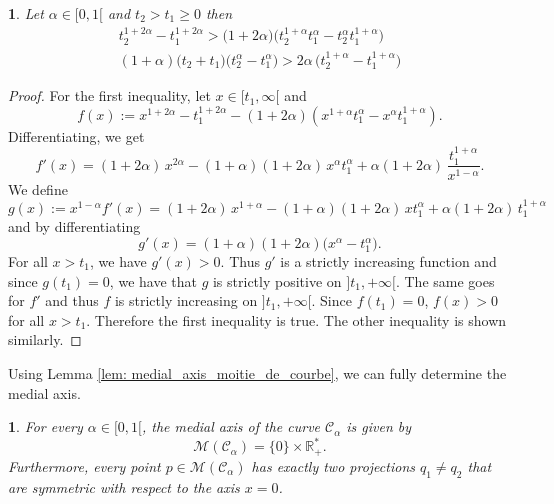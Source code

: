\documentclass[11pt,reqno,a4paper]{article}%
\newtheorem{lemma}[theorem]{\sc{Lemma}}
\theoremstyle{definition}
\theoremstyle{remark}
\renewcommand{\geq}{\geqslant}
\newcommand{\R}{\mathbb{R}}
\newcommand{\C}{\mathbb{C}}
\renewcommand{\C}{\mathcal{C}}
\begin{document}
\begin{lemma} \label{lem: cas_pair_inegalite_intermediare}
Let $\alpha \in [0,1[$ and $t_2 > t_1 \geq 0$ then 
\begin{align*}
	 t_2^{1+2 \alpha} - t_1^{1+2\alpha} > \big( 1+2 \alpha \big) \Big( t_2^{1+\alpha} t_1^\alpha - t_2^\alpha t_1^{1+\alpha} \Big) \\
     (1+\alpha) \big( t_2 + t_1 \big) \big( t_2^{\alpha} - t_1^{\alpha} \big) > 2 \alpha \, \big( t_2^{1+\alpha} - t_1^{1+\alpha} \big)
\end{align*}
\end{lemma}

\begin{proof}
For the first inequality, let $x \in [t_1, \infty [$ and
\[ f(x) := x^{1+2\alpha} - t_1^{1+2\alpha} - ( 1+2 \alpha ) ( x^{1+\alpha} t_1^\alpha - x^\alpha t_1^{1+\alpha} ).\]
Differentiating, we get
\[f'(x) = (1+2 \alpha) \, x^{2\alpha} - (1+\alpha) ( 1+2 \alpha ) \, x^{\alpha} t_1^\alpha + \alpha (1+2 \alpha) \, \frac{t_1^{1+\alpha}}{x^{1-\alpha}} . \]
We define
\[ g(x) := x^{1-\alpha} f'(x) = (1+2 \alpha)\, x^{1+ \alpha} - (1+\alpha) ( 1+2 \alpha ) \, x t_1^\alpha + \alpha (1+2 \alpha) \, t_1^{1+\alpha}  \]
and by differentiating
\[g'(x) = (1+\alpha) (1+2\alpha) \big( x^\alpha - t_1^\alpha \big).\]
For all $x > t_1$, we have $g'(x) > 0$.
Thus $g'$ is a strictly increasing function and since $g(t_1) = 0$, we have that $g$ is strictly positive on $ ]t_1 , + \infty[$.
The same goes for $f'$ and thus $f$ is strictly increasing on $ ]t_1 , + \infty[$. 
Since $f(t_1) = 0$, $f(x) > 0$ for all $x > t_1$. 
Therefore the first inequality is true.
The other inequality is shown similarly.
\end{proof}


\noindent Using Lemma \ref{lem: medial_axis_moitie_de_courbe}, we can fully determine the medial axis.

\begin{lemma} \label{lem: medial_axis_exemple_fonction_pair}
For every $\alpha\in [0,1[$, the medial axis of the curve $\C_\alpha$ is given by
$$\mathscr{M}(\C_\alpha) = \{ 0 \} \times \R_+^*.$$   
Furthermore, every point $p\in\mathscr{M}(\C_\alpha)$ has exactly two projections $q_1\neq q_2$ that are symmetric with respect to the axis $x=0$.
\end{lemma}
\end{document}
